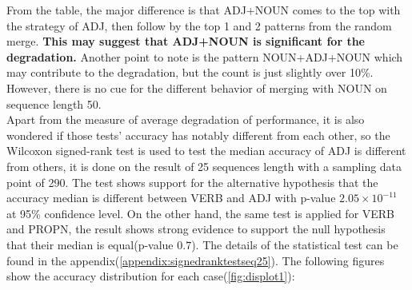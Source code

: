 \documentclass[12pt]{article}
\begin{document}
From the table, the major difference is that ADJ+NOUN comes to the top with the strategy of ADJ, then follow by the top 1 and 2 patterns from the random merge. \textbf{This may suggest that ADJ+NOUN is significant for the degradation.} Another point to note is the pattern NOUN+ADJ+NOUN which may contribute to the degradation, but the count is just slightly over 10\%. However, there is no cue for the different behavior of merging with NOUN on sequence length 50.\\      

Apart from the measure of average degradation of performance, it is also wondered if those tests' accuracy has notably different from each other, so the Wilcoxon signed-rank test is used to test the median accuracy of ADJ is different from others, it is done on the result of 25 sequences length with a sampling data point of 290. The test shows support for the alternative hypothesis that the accuracy median is different between VERB and ADJ with p-value $2.05\times10^{-11}$ at 95\% confidence level. On the other hand, the same test is applied for VERB and PROPN, the result shows strong evidence to support the null hypothesis that their median is equal(p-value $0.7$). The details of the statistical test can be found in the appendix(\ref{appendix:signedranktestseq25}). The following figures show the accuracy distribution for each case(\ref{fig:displot1}): 
\end{document}
